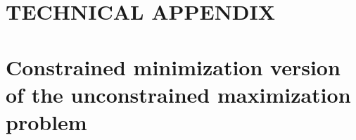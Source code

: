 \documentclass[letterpaper,12pt]{article}
\theoremstyle{definition}
\begin{document}
  \clearpage


\newpage




\newpage
\renewcommand{\theequation}{T.\arabic{section}.\arabic{equation}}
\renewcommand{\thesection}{T-\arabic{section}}   %
\setcounter{equation}{0}                         %
\setcounter{section}{0}                          %
\section*{TECHNICAL APPENDIX}


\section{Constrained minimization version of the unconstrained maximization problem}\label{TAppConstrMin}

  \setcounter{equation}{0}
\end{document}
